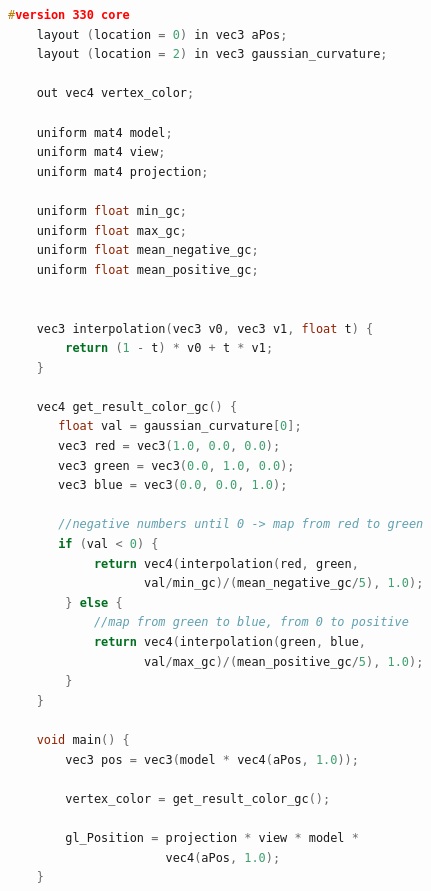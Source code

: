 \begin{lstlisting}[language=C++,
    directivestyle={\color{black}}
    emph={int,char,double,float,unsigned},
    emphstyle={\color{blue}}
   ]
    #version 330 core
    layout (location = 0) in vec3 aPos;
    layout (location = 2) in vec3 gaussian_curvature;

    out vec4 vertex_color;

    uniform mat4 model;
    uniform mat4 view;
    uniform mat4 projection;

    uniform float min_gc;
    uniform float max_gc;
    uniform float mean_negative_gc;
    uniform float mean_positive_gc;


    vec3 interpolation(vec3 v0, vec3 v1, float t) {
        return (1 - t) * v0 + t * v1;
    }

    vec4 get_result_color_gc() {
       float val = gaussian_curvature[0];
       vec3 red = vec3(1.0, 0.0, 0.0);
       vec3 green = vec3(0.0, 1.0, 0.0);
       vec3 blue = vec3(0.0, 0.0, 1.0);

       //negative numbers until 0 -> map from red to green
       if (val < 0) {
            return vec4(interpolation(red, green,
                   val/min_gc)/(mean_negative_gc/5), 1.0);
        } else {
            //map from green to blue, from 0 to positive
            return vec4(interpolation(green, blue,
                   val/max_gc)/(mean_positive_gc/5), 1.0);
        }
    }

    void main() {
        vec3 pos = vec3(model * vec4(aPos, 1.0));

        vertex_color = get_result_color_gc();

        gl_Position = projection * view * model *
                      vec4(aPos, 1.0);
    }
\end{lstlisting}